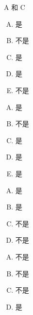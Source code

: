 {{        %
        \begin{practices}
            A 和 C
        \end{practices}

        \begin{practices}
            \begin{enumerate}[A.]
                \item 是
                \item 不是
                \item 是
                \item 是
                \item 不是
            \end{enumerate}
        \end{practices}

        \begin{practices}
            \begin{enumerate}[A.]
                \item 是
                \item 不是
                \item 是
                \item 是
                \item 是
            \end{enumerate}
        \end{practices}

        \begin{practices}
            \begin{enumerate}[A.]
                \item 是
                \item 是
                \item 不是
                \item 不是
            \end{enumerate}
        \end{practices}

        \begin{practices}
            \begin{enumerate}[A.]
                \item 不是
                \item 不是
                \item 不是
                \item 是
            \end{enumerate}
        \end{practices}

}}
